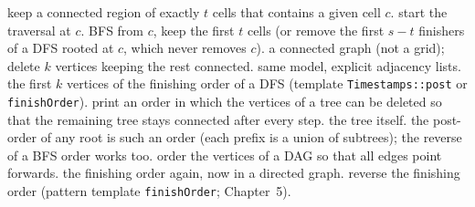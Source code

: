 \begin{variantsbox}
  {keep a connected region of exactly $t$ cells that contains a given cell $c$.}
  {start the traversal at $c$.}
  {BFS from $c$, keep the first $t$ cells (or remove the first $s - t$ finishers of a DFS rooted at $c$, which never removes $c$).}
  {a connected graph (not a grid); delete $k$ vertices keeping the rest connected.}
  {same model, explicit adjacency lists.}
  {the first $k$ vertices of the finishing order of a DFS (template \texttt{Timestamps::post} or \texttt{finishOrder}).}
  {print an order in which the vertices of a tree can be deleted so that the remaining tree stays connected after every step.}
  {the tree itself.}
  {the post-order of any root is such an order (each prefix is a union of subtrees); the reverse of a BFS order works too.}
  {order the vertices of a DAG so that all edges point forwards.}
  {the finishing order again, now in a directed graph.}
  {reverse the finishing order (pattern template \texttt{finishOrder}; Chapter~5).}
\end{variantsbox}
